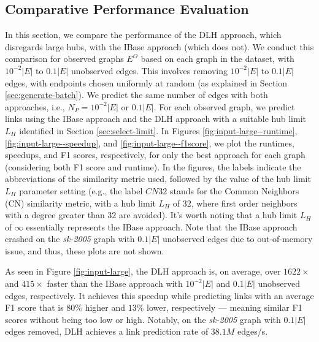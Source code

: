 \subsection{Comparative Performance Evaluation}

In this section, we compare the performance of the DLH approach, which disregards large hubs, with the IBase approach (which does not). We conduct this comparison for observed graphs $E^O$ based on each graph in the dataset, with $10^{-2}|E|$ to $0.1|E|$ unobserved edges. This involves removing $10^{-2}|E|$ to $0.1|E|$ edges, with endpoints chosen uniformly at random (as explained in Section \ref{sec:generate-batch}). We predict the same number of edges with both approaches, i.e., $N_P = 10^{-2}|E|$ or $0.1|E|$. For each observed graph, we predict links using the IBase approach and the DLH approach with a suitable hub limit $L_H$ identified in Section \ref{sec:select-limit}. In Figures \ref{fig:input-large--runtime}, \ref{fig:input-large--speedup}, and \ref{fig:input-large--f1score}, we plot the runtimes, speedups, and F1 scores, respectively, for only the best approach for each graph (considering both F1 score and runtime). In the figures, the labels indicate the abbreviations of the similarity metric used, followed by the value of the hub limit $L_H$ parameter setting (e.g., the label $CN32$ stands for the Common Neighbors (CN) similarity metric, with a hub limit $L_H$ of $32$, where first order neighbors with a degree greater than $32$ are avoided). It's worth noting that a hub limit $L_H$ of $\infty$ essentially represents the IBase approach. Note that the IBase approach crashed on the \textit{sk-2005} graph with $0.1|E|$ unobserved edges due to out-of-memory issue, and thus, these plots are not shown.





As seen in Figure \ref{fig:input-large}, the DLH approach is, on average, over $1622\times$ and $415\times$ faster than the IBase approach with $10^{-2}|E|$ and $0.1|E|$ unobserved edges, respectively. It achieves this speedup while predicting links with an average F1 score that is $80\%$ higher and $13\%$ lower, respectively --- meaning similar F1 scores without being too low or high. Notably, on the \textit{sk-2005} graph with $0.1|E|$ edges removed, DLH achieves a link prediction rate of $38.1M$ edges/s.

